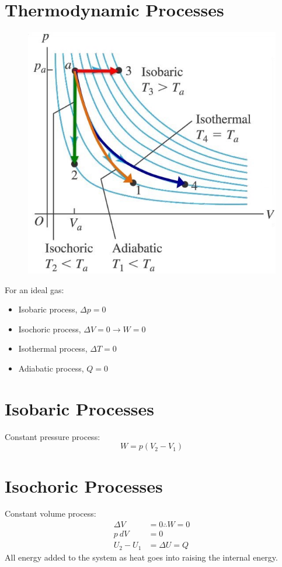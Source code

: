 \documentclass[a4paper, 11pt, normalem]{report}
\begin{document}
\section{Thermodynamic Processes}
\begin{figure}[H]
    \centering
    \includegraphics[scale=0.7]{Processes.jpg}
\end{figure}
For an ideal gas:
\begin{itemize}
	\item Isobaric process, ${\Delta}p = 0$
	\item Isochoric process, ${\Delta}V = 0 \rightarrow W = 0$
	\item Isothermal process, ${\Delta}T = 0$
	\item Adiabatic process, $Q = 0$
\end{itemize}

\section{Isobaric Processes}
Constant pressure process:
\begin{equation}
	W = p(V_{2} - V_{1})
\end{equation}

\section{Isochoric Processes}
Constant volume process:
\begin{align}
    {\Delta}V &= 0 \therefore W = 0 \\
    p\:dV &= 0 \\
    U_{2} - U_{1} &= {\Delta}U = Q
\end{align}
All energy added to the system as heat goes into raising the internal energy.
\end{document}
